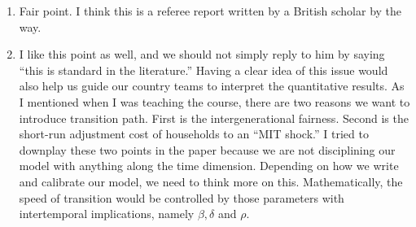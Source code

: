 \documentclass[twoside,11pt,leqno]{article}
\begin{document}
\begin{enumerate}
    \item
    Fair point. I think this is a referee report written by a British scholar by the way.
    \item
    I like this point as well, and we should not simply reply to him by saying ``this is standard in the literature.'' Having a clear idea of this issue would also help us guide our country teams to interpret the quantitative results. As I mentioned when I was teaching the course, there are two reasons we want to introduce transition path. First is the intergenerational fairness. Second is the short-run adjustment cost of households to an ``MIT shock.'' I tried to downplay these two points in the paper because we are not disciplining our model with anything along the time dimension. Depending on how we write and calibrate our model, we need to think more on this. Mathematically, the speed of transition would be controlled by those parameters with intertemporal implications, namely $\beta, \delta$ and $\rho$.
\end{enumerate}



\end{document}
